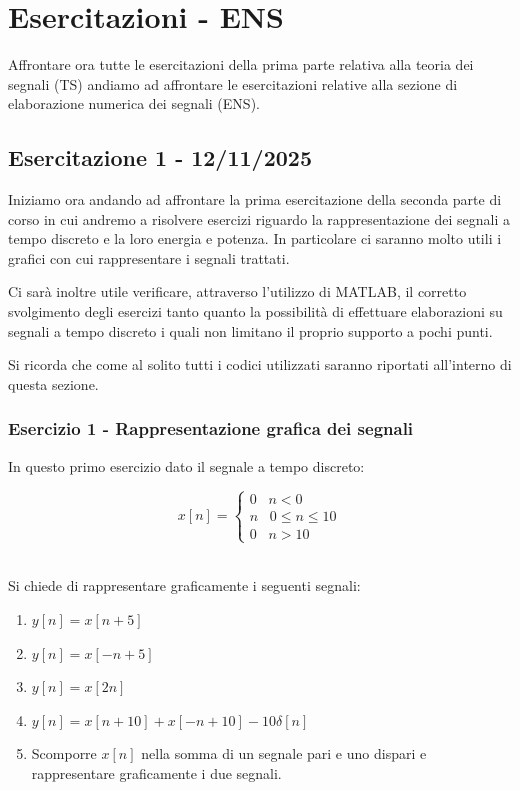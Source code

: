 \documentclass[../main.tex]{subfiles}
\begin{document}
\clearpage
\thispagestyle{empty}
\vspace*{7cm}
\section{Esercitazioni - ENS}
\vspace*{1.5cm}

Affrontare ora tutte le esercitazioni della prima parte relativa alla teoria dei segnali (TS) andiamo ad affrontare le esercitazioni relative alla sezione di elaborazione numerica dei segnali (ENS). 

\subsection{Esercitazione 1 - 12/11/2025}

Iniziamo ora andando ad affrontare la prima esercitazione della seconda parte di corso in cui andremo a risolvere esercizi riguardo la rappresentazione dei segnali a tempo discreto e la loro energia e potenza.
In particolare ci saranno molto utili i grafici con cui rappresentare i segnali trattati. 

Ci sarà inoltre utile verificare, attraverso l'utilizzo di MATLAB, il corretto svolgimento degli esercizi tanto quanto la possibilità di effettuare elaborazioni su segnali a tempo discreto i quali non limitano il proprio supporto a pochi punti. 

Si ricorda che come al solito tutti i codici utilizzati saranno riportati all'interno di questa sezione.
\subsubsection{Esercizio 1 - Rappresentazione grafica dei segnali}

In questo primo esercizio dato il segnale a tempo discreto:

\[ x[n] = \begin{cases}
	0 \hspace{10pt} n < 0\\
	n \hspace{10pt} 0 \leq n \leq 10\\
	0 \hspace{10pt} n > 10
\end{cases} \]\

Si chiede di rappresentare graficamente i seguenti segnali:

\begin{enumerate}
	\item[\textbf{a)}] $y[n] = x[n+5]$
	\item[\textbf{b)}] $y[n] = x[-n+5]$
	\item[\textbf{c)}] $y[n] = x[2n]$
	\item[\textbf{d)}] $y[n] = x[n+10] + x[-n+10] - 10\delta[n]$
	\item[\textbf{e)}] Scomporre $x[n]$ nella somma di un segnale pari e uno dispari e rappresentare graficamente i due segnali.
\end{enumerate}
\end{document}
